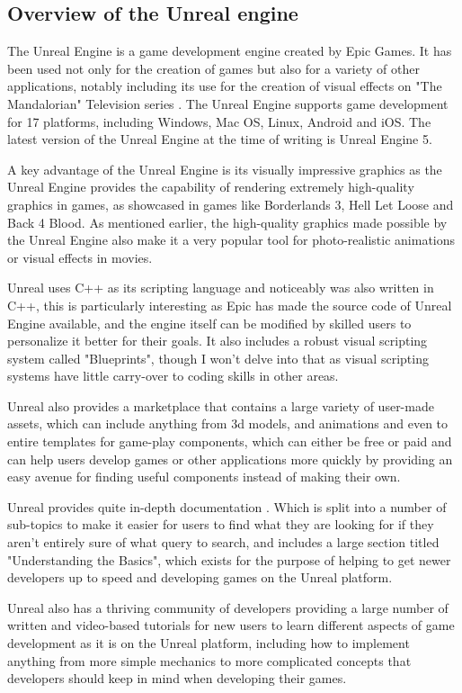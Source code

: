 \subsection{Overview of the Unreal engine}
The Unreal Engine is a game development engine created by Epic Games. It has been used not only for the creation of games but also for a variety of other applications, notably including its use for the creation of visual effects on "The Mandalorian" Television series \cite{UnrealMandalorian}. The Unreal Engine supports game development for 17 platforms, including Windows, Mac OS, Linux, Android and iOS. The latest version of the Unreal Engine at the time of writing is Unreal Engine 5\cite{UnrealFaq}.
\par
A key advantage of the Unreal Engine is its visually impressive graphics as the Unreal Engine provides the capability of rendering extremely high-quality graphics in games, as showcased in games like Borderlands 3, Hell Let Loose and Back 4 Blood. As mentioned earlier, the high-quality graphics made possible by the Unreal Engine also make it a very popular tool for photo-realistic animations or visual effects in movies.
\par
Unreal uses C++ as its scripting language and noticeably was also written in C++, this is particularly interesting as Epic has made the source code of Unreal Engine available, and the engine itself can be modified by skilled users to personalize it better for their goals. It also includes a robust visual scripting system called "Blueprints", though I won't delve into that as visual scripting systems have little carry-over to coding skills in other areas.
\par
Unreal also provides a marketplace that contains a large variety of user-made assets, which can include anything from 3d models, and animations and even to entire templates for game-play components, which can either be free or paid and can help users develop games or other applications more quickly by providing an easy avenue for finding useful components instead of making their own.
\par
Unreal provides quite in-depth documentation \cite{UnrealDocumentation}. Which is split into a number of sub-topics to make it easier for users to find what they are looking for if they aren't entirely sure of what query to search, and includes a large section titled "Understanding the Basics", which exists for the purpose of helping to get newer developers up to speed and developing games on the Unreal platform.
\par
Unreal also has a thriving community of developers providing a large number of written and video-based tutorials for new users to learn different aspects of game development as it is on the Unreal platform, including how to implement anything from more simple mechanics to more complicated concepts that developers should keep in mind when developing their games.
